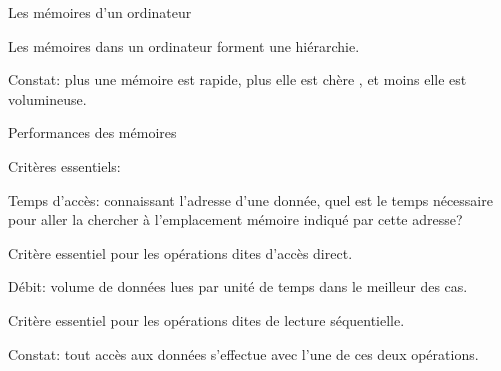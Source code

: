 \begin{frame}{Les mémoires d'un ordinateur}

Les mémoires dans un ordinateur forment une hiérarchie.

\vfill

\alert{Constat}: plus une mémoire est rapide, plus elle est chère , et moins elle est volumineuse.



\vfill


\end{frame}


\begin{frame}{Performances des mémoires}

Critères essentiels:

\begin{redbullet}
  \item \alert{Temps d'accès}: connaissant  l'adresse d'une donnée, quel est le temps
    nécessaire pour aller la chercher  à l'emplacement mémoire indiqué par cette adresse? 
    
    Critère essentiel pour les opérations dites \alert{d'accès direct}.
    
  \item \alert{Débit}: volume de données lues par unité de temps
    dans le meilleur des cas.
    
     Critère essentiel pour les opérations dites de \alert{lecture séquentielle}.
    
\end{redbullet}

\vfill
\begin{blocgauche}
\alert{Constat}: tout accès aux données s'effectue avec l'une de ces deux opérations.
\end{blocgauche}
\end{frame} 
    
